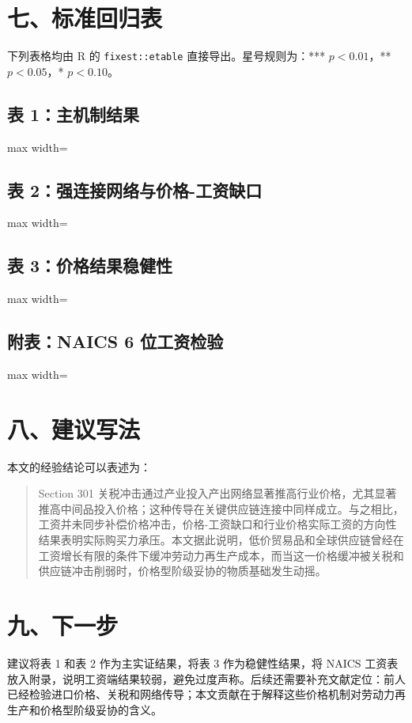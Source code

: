 \documentclass[11pt]{ctexart}
\begin{document}
\section*{七、标准回归表}

下列表格均由 R 的 \texttt{fixest::etable} 直接导出。星号规则为：*** \(p<0.01\)，** \(p<0.05\)，* \(p<0.10\)。

\subsection*{表 1：主机制结果}
\begin{adjustbox}{max width=\textwidth}

\end{adjustbox}

\subsection*{表 2：强连接网络与价格-工资缺口}
\begin{adjustbox}{max width=\textwidth}

\end{adjustbox}

\subsection*{表 3：价格结果稳健性}
\begin{adjustbox}{max width=\textwidth}

\end{adjustbox}

\subsection*{附表：NAICS 6 位工资检验}
\begin{adjustbox}{max width=\textwidth}

\end{adjustbox}

\section*{八、建议写法}

本文的经验结论可以表述为：

\begin{quote}
Section 301 关税冲击通过产业投入产出网络显著推高行业价格，尤其显著推高中间品投入价格；这种传导在关键供应链连接中同样成立。与之相比，工资并未同步补偿价格冲击，价格-工资缺口和行业价格实际工资的方向性结果表明实际购买力承压。本文据此说明，低价贸易品和全球供应链曾经在工资增长有限的条件下缓冲劳动力再生产成本，而当这一价格缓冲被关税和供应链冲击削弱时，价格型阶级妥协的物质基础发生动摇。
\end{quote}

\section*{九、下一步}

建议将表 1 和表 2 作为主实证结果，将表 3 作为稳健性结果，将 NAICS 工资表放入附录，说明工资端结果较弱，避免过度声称。后续还需要补充文献定位：前人已经检验进口价格、关税和网络传导；本文贡献在于解释这些价格机制对劳动力再生产和价格型阶级妥协的含义。
\end{document}
